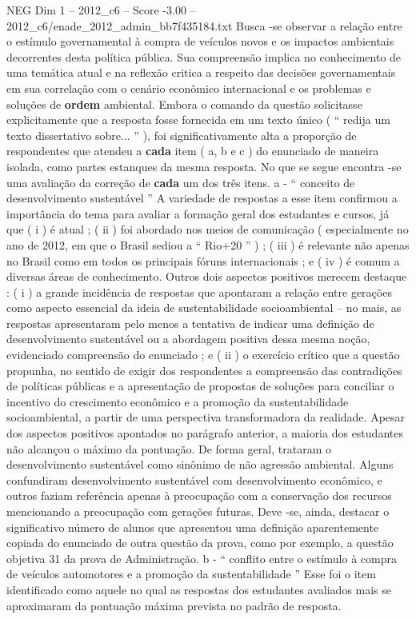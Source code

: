\begin{textsample}{NEG Dim 1 – 2012\_c6 – Score -3.00 – 2012\_c6/enade\_2012\_admin\_bb7f435184.txt}
Busca -se observar a relação entre o estímulo governamental à compra de veículos novos e os impactos ambientais decorrentes desta política pública.
Sua compreensão implica no conhecimento de uma temática atual e na reflexão critica a respeito das decisões governamentais em sua correlação com o cenário econômico internacional e os problemas e soluções de \textbf{ordem} ambiental.
Embora o comando da questão solicitasse explicitamente que a resposta fosse fornecida em um texto único ( “ redija um texto dissertativo sobre... ” ), foi significativamente alta a proporção de respondentes que atendeu a \textbf{cada} item ( a, b e c ) do enunciado de maneira isolada, como partes estanques da mesma resposta.
No que se segue encontra -se uma avaliação da correção de \textbf{cada} um dos três itens. a - “ conceito de desenvolvimento sustentável ” A variedade de respostas a esse item confirmou a importância do tema para avaliar a formação geral dos estudantes e cursos, já que ( i ) é atual ; ( ii ) foi abordado nos meios de comunicação ( especialmente no ano de 2012, em que o Brasil sediou a “ Rio+20 ” ) ; ( iii ) é relevante não apenas no Brasil como em todos os principais fóruns internacionais ; e ( iv ) é comum a diversas áreas de conhecimento.
Outros dois aspectos positivos merecem destaque : ( i ) a grande incidência de respostas que apontaram a relação entre gerações como aspecto essencial da ideia de sustentabilidade socioambiental – no mais, as respostas apresentaram pelo menos a tentativa de indicar uma definição de desenvolvimento sustentável ou a abordagem positiva dessa mesma noção, evidenciado compreensão do enunciado ; e ( ii ) o exercício crítico que a questão propunha, no sentido de exigir dos respondentes a compreensão das contradições de políticas públicas e a apresentação de propostas de soluções para conciliar o incentivo do crescimento econômico e a promoção da sustentabilidade socioambiental, a partir de uma perspectiva transformadora da realidade.
Apesar dos aspectos positivos apontados no parágrafo anterior, a maioria dos estudantes não alcançou o máximo da pontuação.
De forma geral, trataram o desenvolvimento sustentável como sinônimo de não agressão ambiental.
Alguns confundiram desenvolvimento sustentável com desenvolvimento econômico, e outros faziam referência apenas à preocupação com a conservação dos recursos mencionando a preocupação com gerações futuras.
Deve -se, ainda, destacar o significativo número de alunos que apresentou uma definição aparentemente copiada do enunciado de outra questão da prova, como por exemplo, a questão objetiva 31 da prova de Administração. b - “ conflito entre o estímulo à compra de veículos automotores e a promoção da sustentabilidade ” Esse foi o item identificado como aquele no qual as respostas dos estudantes avaliados mais se aproximaram da pontuação máxima prevista no padrão de resposta.

\end{textsample}
